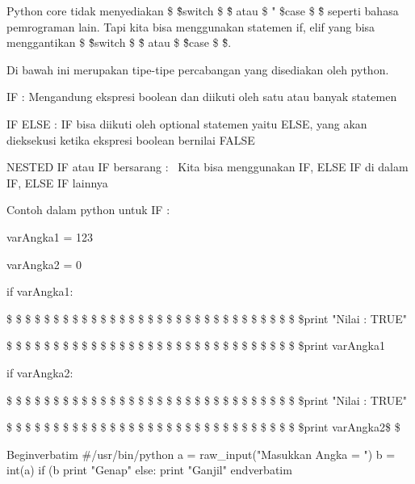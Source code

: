 \vspace{12pt}
\noindent 
Python core tidak menyediakan  \$ \" \$switch \$ \" \$ atau  \$ " \$case \$ \" \$ seperti bahasa pemrograman lain. Tapi kita bisa menggunakan statemen if, elif yang bisa menggantikan  \$ \" \$switch \$ \" \$ atau  \$ \" \$case \$ \" \$. \par
\vspace{12pt}
\noindent 
Di bawah ini merupakan tipe-tipe percabangan yang disediakan oleh python. \par
\vspace{12pt}
\noindent 
IF : Mengandung ekspresi boolean dan diikuti oleh satu atau banyak statemen \par
\vspace{12pt}
\noindent 
IF ELSE : IF bisa diikuti oleh optional statemen yaitu ELSE, yang akan dieksekusi ketika ekspresi boolean bernilai FALSE \par
\vspace{12pt}
\noindent 
NESTED IF atau IF bersarang :~ Kita bisa menggunakan IF, ELSE IF di dalam IF, ELSE IF lainnya \par
\vspace{12pt}
\noindent 
Contoh dalam python untuk IF :  \par
\vspace{12pt}
\noindent 
varAngka1 = 123 \par
\vspace{12pt}
\noindent 
varAngka2 = 0 \par
\vspace{12pt}
\noindent 
if varAngka1: \par
\vspace{12pt}
\noindent 
 \$  \$ \$  \$ \$  \$ \$  \$ \$ \$ \$  \$ \$  \$ \$  \$ \$  \$ \$  \$ \$  \$ \$  \$ \$  \$ \$  \$ \$  \$ \$  \$print "Nilai : TRUE" \par
\vspace{12pt}
\noindent 
 \$  \$ \$  \$ \$  \$ \$  \$ \$  \$ \$  \$ \$  \$ \$  \$ \$  \$ \$  \$ \$  \$ \$  \$ \$  \$ \$  \$ \$  \$ \$  \$print varAngka1 \par
\vspace{12pt}
\noindent 
if varAngka2: \par
\vspace{12pt}
\noindent 
 \$  \$ \$  \$ \$  \$ \$  \$ \$ \$ \$  \$ \$  \$ \$  \$ \$  \$ \$  \$ \$  \$ \$  \$ \$  \$ \$  \$ \$  \$ \$  \$print "Nilai : TRUE" \par
\vspace{12pt}
\noindent 
 \$  \$ \$  \$ \$  \$ \$  \$ \$ \$ \$  \$ \$  \$ \$  \$ \$  \$ \$  \$ \$  \$ \$  \$ \$  \$ \$  \$ \$  \$ \$  \$print varAngka2{\fontsize{14pt}{14pt}\selectfont  \$  \$ \\} \par
\vspace{12pt}
\noindent 
Begin{verbatim}
#/usr/bin/python
a = raw_input("Masukkan Angka = ")
b = int(a)
if (b%
        print "Genap"
else:
        print "Ganjil"
end{verbatim}

